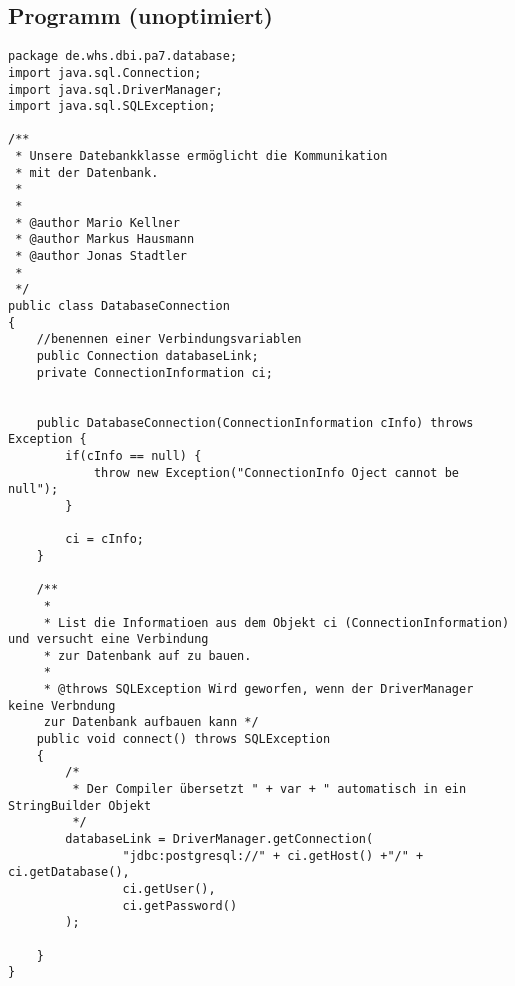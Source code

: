 \subsection{Programm (unoptimiert)}
\label{app:programmv1}

\begin{lstlisting}[caption={DatabaseConnection}, label={lst:dbv1}]
package de.whs.dbi.pa7.database;
import java.sql.Connection;
import java.sql.DriverManager;
import java.sql.SQLException;

/**
 * Unsere Datebankklasse ermöglicht die Kommunikation
 * mit der Datenbank. 
 * 
 * 
 * @author Mario Kellner
 * @author Markus Hausmann
 * @author Jonas Stadtler
 *
 */
public class DatabaseConnection 
{
	//benennen einer Verbindungsvariablen
	public Connection databaseLink;
	private ConnectionInformation ci;
	
	
	public DatabaseConnection(ConnectionInformation cInfo) throws Exception {
		if(cInfo == null) {
			throw new Exception("ConnectionInfo Oject cannot be null");
		}
		
		ci = cInfo;
	}
	
	/**
	 * 
	 * List die Informatioen aus dem Objekt ci (ConnectionInformation) und versucht eine Verbindung 
	 * zur Datenbank auf zu bauen.
	 * 
	 * @throws SQLException Wird geworfen, wenn der DriverManager keine Verbndung
	 zur Datenbank aufbauen kann */
	public void connect() throws SQLException
	{
		/*
		 * Der Compiler übersetzt " + var + " automatisch in ein StringBuilder Objekt
		 */
		databaseLink = DriverManager.getConnection(
				"jdbc:postgresql://" + ci.getHost() +"/" + ci.getDatabase(),
				ci.getUser(), 
				ci.getPassword()
		);
		
	}
}

\end{lstlisting}

